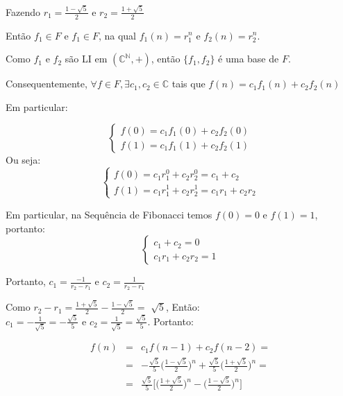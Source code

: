 \documentclass[a4paper,11pt]{article}
\theoremstyle{definition} \newtheorem{definicao}{Def}
\theoremstyle{definition} \newtheorem{exemplo}{Exemplo}
\theoremstyle{plain}      \newtheorem{teorema}{Teorema}
\theoremstyle{remark}     \newtheorem*{corolario}{Corol\'{a}rio}
\begin{document}
Fazendo $r_1 = \frac{1 - \sqrt{5}}{2}$ e $r_2 = \frac{1 + \sqrt{5}}{2}$

Ent\~{a}o $f_1 \in F$ e $f_1 \in F$, na qual $f_1(n)=r_1^n$
e $f_2(n)=r_2^n$.

Como $f_1$ e $f_2$ s\~{a}o LI em $(\mathbb{C}^\mathbb{N},+)$,
ent\~{a}o $\{f_1,f_2\}$ \'{e} uma base de $F$.

Consequentemente, $\forall f \in F, \exists c_1,c_2 \in \mathbb{C}$
tais que $f(n) = c_1f_1(n) + c_2f_2(n)$

Em particular:

\begin{equation*}
\begin{cases}
f(0) = c_1f_1(0) + c_2f_2(0) \\
f(1) = c_1f_1(1) + c_2f_2(1)
\end{cases}
\end{equation*}
Ou seja:
\begin{equation*}
\begin{cases}
f(0) = c_1r_1^0 + c_2r_2^0 = c_1 + c_2 \\
f(1) = c_1r_1^1 + c_2r_2^1 = c_1r_1 + c_2r_2
\end{cases}
\end{equation*}

Em particular, na Sequ\^{e}ncia de Fibonacci temos $f(0) = 0$ e
$f(1) = 1$, portanto:
\begin{equation*}
\begin{cases}
c_1 + c_2 = 0\\
c_1r_1 + c_2r_2 = 1
\end{cases}
\end{equation*}

Portanto, $c_1 = \frac{-1}{r_2-r_1}$ e $c_2 = \frac{1}{r_2-r_1}$

Como $r_2 - r_1 = \frac{1+\sqrt{5}}{2} - \frac{1-\sqrt{5}}{2} = $
$\sqrt{5}$, Ent\~{a}o:\\
$c_1 = - \frac{1}{\sqrt{5}} = - \frac{\sqrt{5}}{5}$ e
$c_2 = \frac{1}{\sqrt{5}} = \frac{\sqrt{5}}{5}$. Portanto:

\begin{eqnarray*}
f(n) & = & c_1f(n-1) + c_2f(n-2) = \\
& = & - \frac{\sqrt{5}}{5}\Big(\frac{1-\sqrt{5}}{2}\Big)^n +
\frac{\sqrt{5}}{5}\Big(\frac{1+\sqrt{5}}{2}\Big)^n = \\
& = & \frac{\sqrt{5}}{5} \bigg[\Big(\frac{1+\sqrt{5}}{2}\Big)^n -
\Big(\frac{1-\sqrt{5}}{2}\Big)^n\bigg]
\end{eqnarray*}
\end{document}
